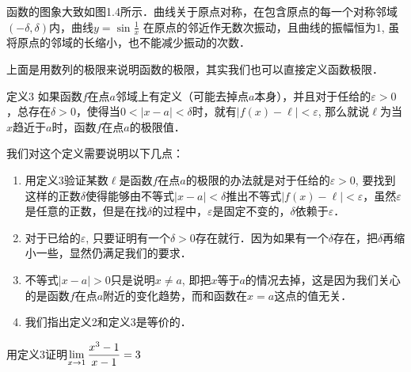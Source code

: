 函数的图象大致如图1.4所示．曲线关于原点对称，在包含原点的每一个对称邻域$(-\delta, \delta)$内，曲线$y=\sin\frac{1}{x}$
在原点的邻近作无数次振动，且曲线的振幅恒为1, 虽将原点的邻域的长缩小，也不能减少振动的次数．

\begin{figure}[htp]
    \centering
{}    
    \caption{}
\end{figure}

上面是用数列的极限来说明函数的极限，其实我们也可以直接定义函数极限．

\begin{blk}{定义3}
  如果函数$f$在点$a$邻域上有定义（可能去掉点$a$本身），并且对于任给的$\varepsilon>0$，总存在$\delta>0$，使得当$0<|x-a|<\delta$时，就有$|f(x)-\ell|<\varepsilon$, 那么就说$\ell$为当$x$趋近于$a$时，函数$f$在点$a$的极限值．
\end{blk}

我们对这个定义需要说明以下几点：
\begin{enumerate}
    \item 用定义3验证某数$\ell$是函数$f$在点$a$的极限的办法就是对于任给的$\varepsilon>0$, 要找到这样的正数$\delta$使得能够由不等式$|x-a|<\delta$推出不等式$|f(x)-\ell|<\varepsilon$，虽然$\varepsilon$是任意的正数，但是在找$\delta$的过程中，$\varepsilon$是固定不变的，$\delta$依赖于$\varepsilon$．
    \item 对于已给的$\varepsilon$, 只要证明有一个$\delta>0$存在就行．因为如果有一个$\delta$存在，把$\delta$再缩小一些，显然仍满足我们的要求．
    \item 不等式$|x-a|>0$只是说明$x\ne a$, 即把$x$等于$a$的情况去掉，这是因为我们关心的是函数$f$在点$a$附近的变化趋势，而和函数在$x=a$这点的值无关．
    \item 我们指出定义2和定义3是等价的．
\end{enumerate}

\begin{example}
用定义3证明$\displaystyle\lim_{x\to 1}\dfrac{x^3-1}{x-1}=3$
\end{example}

